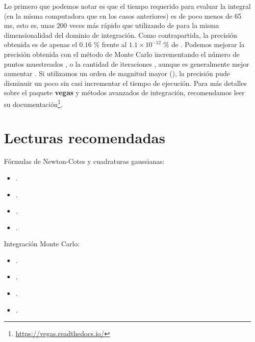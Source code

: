 
Lo primero que podemos notar es que el tiempo requerido para evaluar la integral (en la misma computadora que en los casos anteriores) es de poco menos de 65 ms, esto es, unas 200 veces más rápido que utilizando  de  para la misma dimensionalidad del dominio de integración. Como contrapartida, la precisión obtenida es de apenas el $0.16$ \% frente al $1.1 \times 10^{-12}$ \% de . Podemos mejorar la precisión obtenida con el método de Monte Carlo incrementando el número de puntos muestreados , o la cantidad de iteraciones , aunque es generalmente mejor aumentar . Si utilizamos un orden de magnitud mayor (), la precisión pude disminuir un poco sin casi incrementar el tiempo de ejecución. Para más detalles sobre el paquete \textbf{vegas} y métodos avanzados de integración, recomendamos leer su documentación\footnote{\href{https://vegas.readthedocs.io/}{https://vegas.readthedocs.io/}}.


\section{Lecturas recomendadas}
Fórmulas de Newton-Cotes y cuadraturas gaussianas:
\begin{itemize}
 \item {}.
 \item {}.
 \item {}.
 \item {}.
\end{itemize}

Integración Monte Carlo:
\begin{itemize}
 \item {}. 
 \item {}.
 \item {}.
 \item {}.
\end{itemize}

